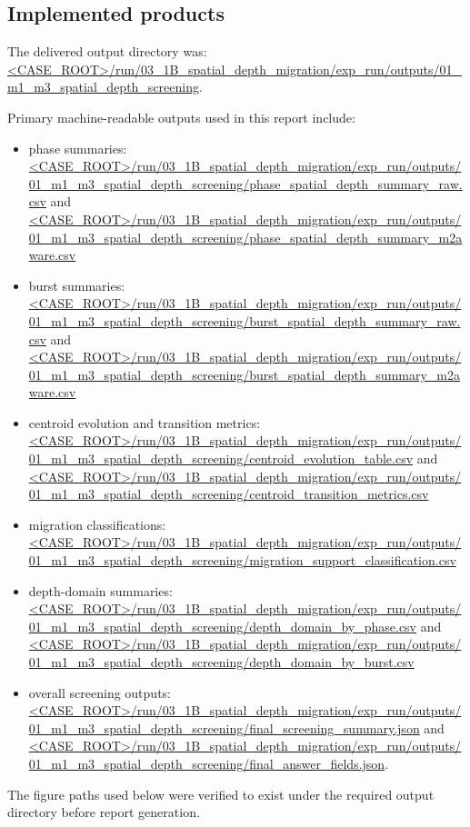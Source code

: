 \documentclass[11pt]{article}
\begin{document}
\subsection{Implemented products}
The delivered output directory was:
\url{<CASE_ROOT>/run/03_1B_spatial_depth_migration/exp_run/outputs/01_m1_m3_spatial_depth_screening}.

Primary machine-readable outputs used in this report include:
\begin{itemize}[leftmargin=1.5em]
    \item phase summaries: \url{<CASE_ROOT>/run/03_1B_spatial_depth_migration/exp_run/outputs/01_m1_m3_spatial_depth_screening/phase_spatial_depth_summary_raw.csv}
    and \url{<CASE_ROOT>/run/03_1B_spatial_depth_migration/exp_run/outputs/01_m1_m3_spatial_depth_screening/phase_spatial_depth_summary_m2aware.csv}
    \item burst summaries: \url{<CASE_ROOT>/run/03_1B_spatial_depth_migration/exp_run/outputs/01_m1_m3_spatial_depth_screening/burst_spatial_depth_summary_raw.csv}
    and \url{<CASE_ROOT>/run/03_1B_spatial_depth_migration/exp_run/outputs/01_m1_m3_spatial_depth_screening/burst_spatial_depth_summary_m2aware.csv}
    \item centroid evolution and transition metrics: \url{<CASE_ROOT>/run/03_1B_spatial_depth_migration/exp_run/outputs/01_m1_m3_spatial_depth_screening/centroid_evolution_table.csv} and \url{<CASE_ROOT>/run/03_1B_spatial_depth_migration/exp_run/outputs/01_m1_m3_spatial_depth_screening/centroid_transition_metrics.csv}
    \item migration classifications: \url{<CASE_ROOT>/run/03_1B_spatial_depth_migration/exp_run/outputs/01_m1_m3_spatial_depth_screening/migration_support_classification.csv}
    \item depth-domain summaries: \url{<CASE_ROOT>/run/03_1B_spatial_depth_migration/exp_run/outputs/01_m1_m3_spatial_depth_screening/depth_domain_by_phase.csv} and \url{<CASE_ROOT>/run/03_1B_spatial_depth_migration/exp_run/outputs/01_m1_m3_spatial_depth_screening/depth_domain_by_burst.csv}
    \item overall screening outputs: \url{<CASE_ROOT>/run/03_1B_spatial_depth_migration/exp_run/outputs/01_m1_m3_spatial_depth_screening/final_screening_summary.json}
    and \url{<CASE_ROOT>/run/03_1B_spatial_depth_migration/exp_run/outputs/01_m1_m3_spatial_depth_screening/final_answer_fields.json}.
\end{itemize}

The figure paths used below were verified to exist under the required output directory before report generation.
\end{document}
